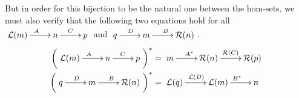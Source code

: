 \begin{Example}
But in order for this bijection to be the natural one between the hom-sets, we must also verify that the following two equations hold for all $\xymatrix{\fun L(m) \ar[r]^{A} & n \ar[r]^C & p}$ and $\xymatrix{q \ar[r]^D & m \ar[r]^B & \fun R(n)}$.
\begin{align*}
\pqty{ \xymatrix{\fun L(m) \ar[r]^{A} & n \ar[r]^C & p} }^* & = \xymatrix{m \ar[r]^{A^*} & \fun R(n) \ar[r]^{\fun R(C)} & \fun R(p)}\\
\pqty{ \xymatrix{q \ar[r]^D & m \ar[r]^B & \fun R(n)} }^* & = \xymatrix{\fun L(q) \ar[r]^{\fun L(D)} & \fun L(m) \ar[r]^{B^*} & n}
\end{align*}
\end{Example}
